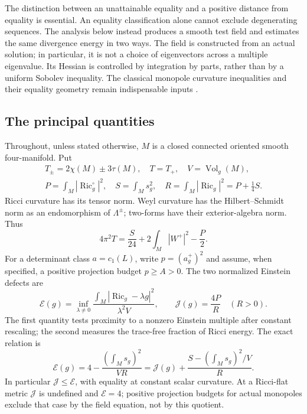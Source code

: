 \documentclass[10pt,a4paper]{article}
\theoremstyle{definition}
\theoremstyle{remark}
\numberwithin{equation}{section}
\providecommand{\Ric}{\operatorname{Ric}}
\providecommand{\Vol}{\operatorname{Vol}}
\providecommand{\E}{\mathcal E}
\providecommand{\J}{\mathcal J}
\begin{document}
The distinction between an unattainable equality and a positive distance
from equality is essential. An equality classification alone cannot
exclude degenerating sequences. The analysis below instead produces a
smooth test field and estimates the same divergence energy in two ways.
The field is constructed from an actual solution; in particular, it is
not a choice of eigenvectors across a multiple eigenvalue. Its Hessian
is controlled by integration by parts, rather than by a uniform Sobolev
inequality. The classical monopole curvature inequalities and their
equality geometry remain indispensable inputs
\cite{LeBrun2001,Kotschick2004,IshidaLeBrun2003,IMN2016}.

\subsection{The principal quantities}
Throughout, unless stated otherwise, $M$ is a closed connected oriented
smooth four-manifold. Put
\[
 \begin{gathered}
 T_\pm=2\chi(M)\pm3\tau(M),\quad T=T_+,\quad V=\Vol_g(M),\\
 P=\int_M|\Ric_g^\circ|^2,\quad S=\int_Ms_g^2,
 \quad R=\int_M|\Ric_g|^2=P+\frac14S.
 \end{gathered}
\]
Ricci curvature has its tensor norm. Weyl curvature has the
Hilbert--Schmidt norm as an endomorphism of $\Lambda^\pm$; two-forms have
their exterior-algebra norm. Thus
\begin{equation}\label{eq:intro-cw}
 4\pi^2T=\frac{S}{24}+2\int_M|W^+|^2-\frac{P}{2}.
\end{equation}
For a determinant class $a=c_1(L)$, write $p=(a_g^+)^2$ and assume, when
specified, a positive projection budget $p\ge A>0$. The two normalized
Einstein defects are
\begin{equation}\label{eq:intro-defects}
 \E(g)=\inf_{\lambda\ne0}
 \frac{\int_M|\Ric_g-\lambda g|^2}{\lambda^2V},
 \qquad \J(g)=\frac{4P}{R}\quad(R>0).
\end{equation}
The first quantity tests proximity to a nonzero Einstein multiple after
constant rescaling; the second measures the trace-free fraction of Ricci
energy. The exact relation is
\[
 \E(g)=4-\frac{(\int_Ms_g)^2}{VR}
       =\J(g)+\frac{S-(\int_Ms_g)^2/V}{R}.
\]
In particular $\J\le\E$, with equality at constant scalar curvature.
At a Ricci-flat metric $\J$ is undefined and $\E=4$; positive projection
budgets for actual monopoles exclude that case by the field equation, not by this
quotient.
\end{document}
